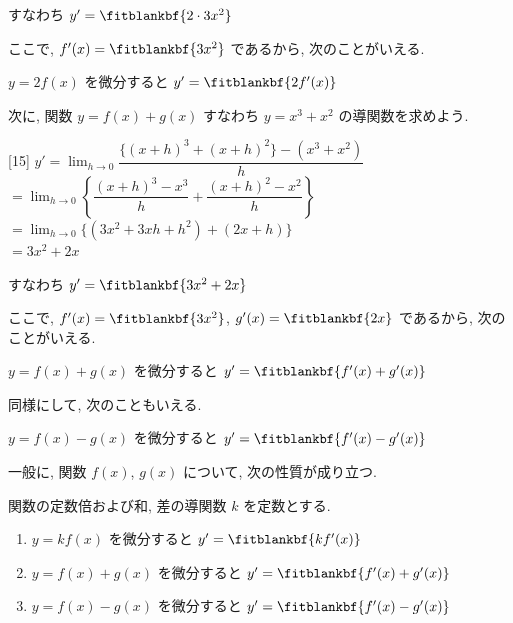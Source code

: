 \documentclass[14pt,dvipdfmx]{jsarticle}
\begin{document}
\vfill
\nextpage

\vspace{-1.4zw}%
すなわち $y'=\fitblankbf{2\cdot 3x^{2}}$
\par\vspace{0.35em}
ここで, $f'(x)=\fitblankbf{3x^{2}}$ であるから, 次のことがいえる.
\par\vspace{0.3em}
$y=2f(x)$ を微分すると \quad $y'=\fitblankbf{2f'(x)}$

\vspace{1.5em}
次に, 関数 $y=f(x)+g(x)$ すなわち $y=x^{3}+x^{2}$ の導関数を求めよう.

\begin{answerbox}{}[15]
  $y'=\lim_{h \to 0}\dfrac{\{(x+h)^{3}+(x+h)^{2}\}-(x^{3}+x^{2})}{h}$\\[0.45em]
  $=\lim_{h \to 0}\left\{\dfrac{(x+h)^{3}-x^{3}}{h}+\dfrac{(x+h)^{2}-x^{2}}{h}\right\}$\\[0.45em]
  $=\lim_{h \to 0}\{(3x^{2}+3xh+h^{2})+(2x+h)\}$\\[0.4em]
  $=3x^{2}+2x$
\end{answerbox}
\vspace{0.5em}
すなわち $y'=\fitblankbf{3x^{2}+2x}$
\par\vspace{0.35em}
ここで, $f'(x)=\fitblankbf{3x^{2}}$, $g'(x)=\fitblankbf{2x}$ であるから,
次のことがいえる.
\par\vspace{0.3em}
$y=f(x)+g(x)$ を微分すると \quad $y'=\fitblankbf{f'(x)+g'(x)}$
\par\vspace{0.55em}
同様にして, 次のこともいえる.
\par\vspace{0.3em}
$y=f(x)-g(x)$ を微分すると \quad $y'=\fitblankbf{f'(x)-g'(x)}$
\vspace{1.5em}

一般に, 関数 $f(x)$, $g(x)$ について, 次の性質が成り立つ.

\vspace{-0.15em}
\begin{theorembox}{関数の定数倍および和, 差の導関数}
  $k$ を定数とする.
  \par\vspace{0.2em}
  \begin{enumerate}[label=\textbf{\arabic*}, leftmargin=1.6zw, itemsep=0.45em]
    \item $y=kf(x)$ を微分すると \quad
          $y'=\fitblankbf{kf'(x)}$
    \item $y=f(x)+g(x)$ を微分すると \quad
          $y'=\fitblankbf{f'(x)+g'(x)}$
    \item $y=f(x)-g(x)$ を微分すると \quad
          $y'=\fitblankbf{f'(x)-g'(x)}$
  \end{enumerate}
\end{theorembox}
\end{document}
